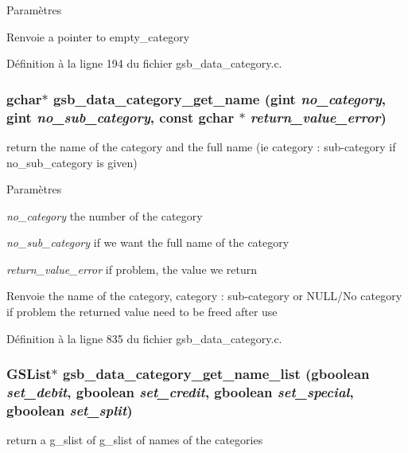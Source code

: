 \begin{DoxyParams}{Paramètres}
\item[{\em }]\end{DoxyParams}
\begin{DoxyReturn}{Renvoie}
a pointer to empty\_\-category 
\end{DoxyReturn}


Définition à la ligne 194 du fichier gsb\_\-data\_\-category.c.

\subsubsection[{gsb\_\-data\_\-category\_\-get\_\-name}]{\setlength{\rightskip}{0pt plus 5cm}gchar$\ast$ gsb\_\-data\_\-category\_\-get\_\-name (gint {\em no\_\-category}, \/  gint {\em no\_\-sub\_\-category}, \/  const gchar $\ast$ {\em return\_\-value\_\-error})}\label{gsb__data__category_8h_a615342249ac310a61000690303ce88a9}
return the name of the category and the full name (ie category : sub-\/category if no\_\-sub\_\-category is given)


\begin{DoxyParams}{Paramètres}
\item[{\em no\_\-category}]the number of the category \item[{\em no\_\-sub\_\-category}]if we want the full name of the category \item[{\em return\_\-value\_\-error}]if problem, the value we return\end{DoxyParams}
\begin{DoxyReturn}{Renvoie}
the name of the category, category : sub-\/category or NULL/No category if problem the returned value need to be freed after use 
\end{DoxyReturn}


Définition à la ligne 835 du fichier gsb\_\-data\_\-category.c.

\subsubsection[{gsb\_\-data\_\-category\_\-get\_\-name\_\-list}]{\setlength{\rightskip}{0pt plus 5cm}GSList$\ast$ gsb\_\-data\_\-category\_\-get\_\-name\_\-list (gboolean {\em set\_\-debit}, \/  gboolean {\em set\_\-credit}, \/  gboolean {\em set\_\-special}, \/  gboolean {\em set\_\-split})}\label{gsb__data__category_8h_ac9e9466a500b7589b2b38af6ffdc9a27}
return a g\_\-slist of g\_\-slist of names of the categories


